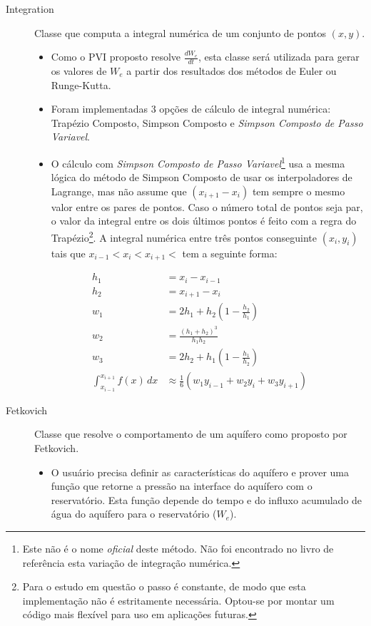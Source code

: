 \documentclass[final,5p]{elsarticle}
\numberwithin{equation}{section}
\begin{document}
\begin{description}
            \item[Integration] Classe que computa a integral numérica de um conjunto de pontos $(x,y)$.
            \begin{itemize}
                \item Como o PVI proposto resolve $\frac{dW_e}{dt}$, esta classe será utilizada para gerar os valores de $W_e$ a partir dos resultados dos métodos de Euler ou Runge-Kutta.
                \item Foram implementadas 3 opções de cálculo de integral numérica: Trapézio Composto, Simpson Composto e \emph{Simpson Composto de Passo Variavel}.
                \item O cálculo com \emph{Simpson Composto de Passo Variavel}\footnote{Este não é o nome \emph{oficial} deste método. Não foi encontrado no livro de referência esta variação de integração numérica.} usa a mesma lógica do método de Simpson Composto de usar os interpoladores de Lagrange, mas não assume que $(x_{i+1}-x_i)$ tem sempre o mesmo valor entre os pares de pontos. Caso o número total de pontos seja par, o valor da integral entre os dois últimos pontos é feito com a regra do Trapézio\footnote{Para o estudo em questão o passo é constante, de modo que esta implementação não é estritamente necessária. Optou-se por montar um código mais flexível para uso em aplicações futuras.}. A integral numérica entre três pontos conseguinte $(x_i,y_i)$ tais que $x_{i-1}<x_{i}<x_{i+1}<$ tem a seguinte forma:
            \end{itemize}

            \begin{align}
                h_1 &= x_i - x_{i-1} \nonumber \\
                h_2 &= x_{i+1} - x_{i} \nonumber \\
                w_1 &= 2 h_1 + h_2 \left(1-\frac{h_2}{h_1} \right) \nonumber \\
                w_2 &= \frac{(h_1 + h_2)^3}{h_1 h_2}\nonumber \\
                w_3 &= 2 h_2 + h_1 \left(1-\frac{h_1}{h_2} \right) \nonumber \\
                \int_{x_{i-1}}^{x_{i+1}} f(x) \, dx &\approx \frac{1}{6} (w_1 y_{i-1} + w_2 y_{i} + w_3 y_{i+1}) \label{eq:simpsonvariavel}
            \end{align}

            \item[Fetkovich] Classe que resolve o comportamento de um aquífero como proposto por Fetkovich.
            \begin{itemize}
                \item O usuário precisa definir as características do aquífero e prover uma função que retorne a pressão na interface do aquífero com o reservatório. Esta função depende do tempo e do influxo acumulado de água do aquífero para o reservatório ($W_e$).
            \end{itemize}
        \end{description}
\end{document}
